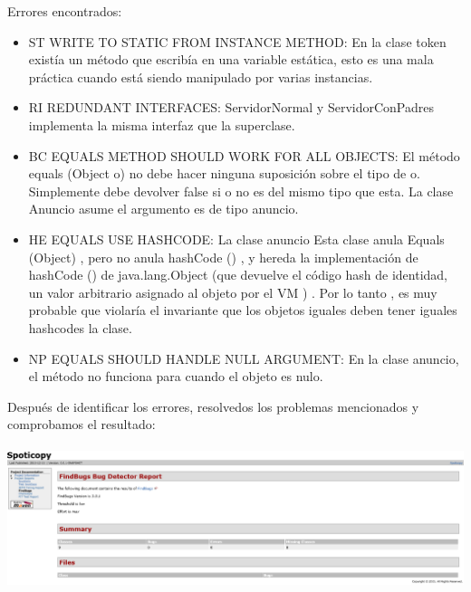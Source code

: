 \documentclass[12pt, a4paper, titlepage]{article}
\begin{document}
	Errores encontrados:
	\begin{itemize}
		\item 	ST WRITE TO STATIC FROM INSTANCE METHOD: En la clase token existía un método que escribía en una variable estática, esto es una mala práctica cuando está siendo manipulado por varias instancias.
		\item 	RI REDUNDANT INTERFACES: ServidorNormal y ServidorConPadres implementa la misma interfaz que la superclase.
		\item BC EQUALS METHOD SHOULD WORK FOR ALL OBJECTS: El método equals (Object o) no debe hacer ninguna suposición sobre el tipo de o. Simplemente debe devolver false si o no es del mismo tipo que esta. La clase Anuncio asume el argumento es de tipo anuncio.
		\item HE EQUALS USE HASHCODE: La clase anuncio Esta clase anula Equals (Object) , pero no anula hashCode () , y hereda la implementación de hashCode () de java.lang.Object (que devuelve el código hash de identidad, un valor arbitrario asignado al objeto por el VM ) . Por lo tanto , es muy probable que violaría el invariante que los objetos iguales deben tener iguales hashcodes la clase.
		\item NP EQUALS SHOULD HANDLE NULL ARGUMENT: En la clase anuncio, el método no funciona para cuando el objeto es nulo.	
	\end{itemize}
	Después de identificar los errores, resolvedos los problemas mencionados y comprobamos el resultado:\\
	\\
	\includegraphics[width=15cm]{Imagenes/FindsBugs2.png} \\
\end{document}
